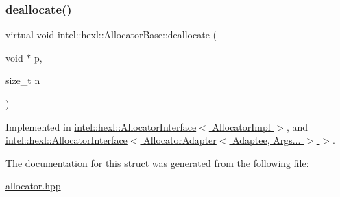 \subsubsection{\texorpdfstring{deallocate()}{deallocate()}}
{\footnotesize\ttfamily virtual void intel\+::hexl\+::\+Allocator\+Base\+::deallocate (\begin{DoxyParamCaption}\item[{void $\ast$}]{p,  }\item[{size\+\_\+t}]{n }\end{DoxyParamCaption})\hspace{0.3cm}{\ttfamily [pure virtual]}}



Implemented in \hyperlink{structintel_1_1hexl_1_1AllocatorInterface_a2684feec3b8f3cfba626b46912b4cec5}{intel\+::hexl\+::\+Allocator\+Interface$<$ Allocator\+Impl $>$}, and \hyperlink{structintel_1_1hexl_1_1AllocatorInterface_a2684feec3b8f3cfba626b46912b4cec5}{intel\+::hexl\+::\+Allocator\+Interface$<$ Allocator\+Adapter$<$ Adaptee, Args... $>$ $>$}.



The documentation for this struct was generated from the following file\+:\begin{DoxyCompactItemize}
\item 
\hyperlink{allocator_8hpp}{allocator.\+hpp}\end{DoxyCompactItemize}
